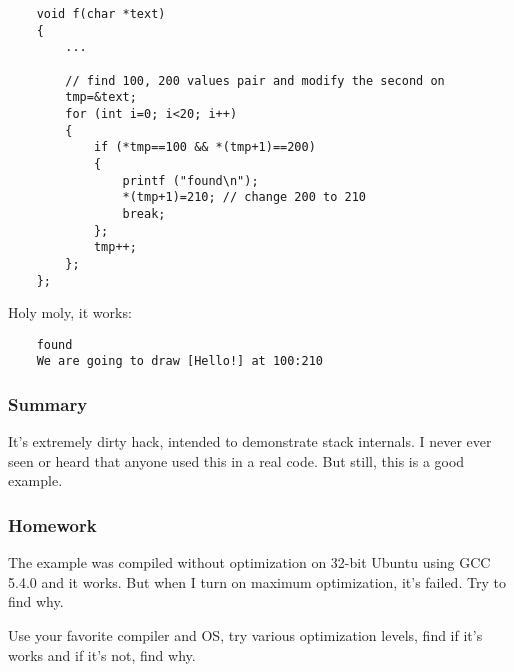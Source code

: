 \begin{lstlisting}
	void f(char *text)
	{
		...

		// find 100, 200 values pair and modify the second on
		tmp=&text;
		for (int i=0; i<20; i++)
		{
			if (*tmp==100 && *(tmp+1)==200)
			{
				printf ("found\n");
				*(tmp+1)=210; // change 200 to 210
				break;
			};
			tmp++;
		};
	};
\end{lstlisting}

Holy moly, it works:

\begin{lstlisting}
	found
	We are going to draw [Hello!] at 100:210
\end{lstlisting}

\subsubsection{Summary}

It's extremely dirty hack, intended to demonstrate stack internals.
I never ever seen or heard that anyone used this in a real code.
But still, this is a good example.

\subsubsection{Homework}

The example was compiled without optimization on 32-bit Ubuntu using GCC 5.4.0 and it works.
But when I turn on  maximum optimization, it's failed.
Try to find why.

Use your favorite compiler and OS, try various optimization levels, find if it's works and if it's not, find why.

